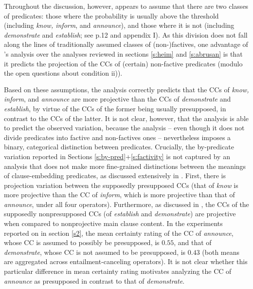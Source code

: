 \documentclass[a4paper,12pt,twoside]{article}
\newcommand{\poscite}[1]{\citeauthor{#1}'s \citeyear{#1}}
\begin{document}
    Throughout the discussion, however, \citealt{schlenker_triggering_2021} appears to assume that there are two classes of predicates: those where the probability is usually above the threshold (including {\em know, inform}, and {\em announce}), and those where it is not (including {\em demonstrate} and {\em establish}; see p.12 and appendix I).
    As this division does not fall along the lines of traditionally assumed classes of (non-)factives,
    one advantage of \poscite{schlenker_triggering_2021} analysis over the analyses reviewed in sections \ref{s:heim} and \ref{s:abrusan} is that it predicts the projection of the CCs of (certain) non-factive predicates (modulo the open questions about condition ii)).

    Based on these assumptions, the analysis correctly predicts that the CCs of \emph{know, inform}, and \emph{announce} are more projective than the CCs of \emph{demonstrate} and \emph{establish}, by virtue of the CCs of the former being usually presupposed, in contrast to the CCs of the latter. It is not clear, however, that the analysis is able to predict the observed variation, because the analysis -- even  though it does not divide predicates into factive and non-factives ones -- nevertheless imposes a binary, categorical distinction between predicates.
    Crucially, the by-predicate variation reported in Sections \ref{s:by-pred}+\ref{s:factivity} is not captured by an analysis that does not make more fine-grained distinctions between the meanings of clause-embedding predicates, as discussed extensively in \citealt{degen_are_2022}. First, there is projection variation between the supposedly presupposed CCs (that of \emph{know} is more projective than the CC of \emph{inform}, which is more projective than that of \emph{announce}, under all four operators).
    Furthermore, as discussed in \citealt{degen_are_2022}, the CCs of the supposedly nonpresupposed CCs (of \emph{establish} and \emph{demonstrate}) are projective when compared to nonprojective main clause content. In the experiments reported on in section \ref{s2}, the mean certainty rating of the CC of \emph{announce}, whose CC is assumed to possibly be presupposed, is $0.55$, and that of {\em demonstrate}, whose CC is not assumed to be presupposed, is $0.43$ (both means are aggregated across entailment-canceling operators). It is not clear whether this particular difference in mean certainty rating motivates analyzing the CC of \emph{announce} as presupposed in contrast to that of \emph{demonstrate}.
\end{document}
